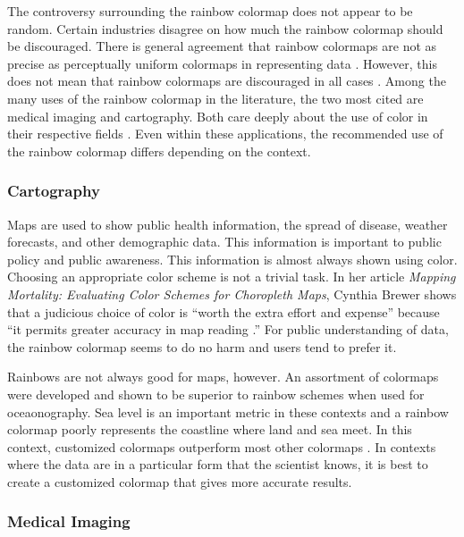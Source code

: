 \documentclass[journal]{IEEEtran}
\begin{document}
The controversy surrounding the rainbow colormap does not appear to be random.
Certain industries disagree on how much the rainbow colormap should be 
discouraged. There is general agreement that rainbow colormaps are not as 
precise as perceptually uniform colormaps in representing data 
\cite{blackvwhite}. However, this 
does not mean that rainbow colormaps are discouraged in all cases
 \cite{spectralschemes}. 
Among the many uses of the rainbow colormap in the
literature, the two most cited are
medical imaging and cartography. Both care deeply about the use of color in 
their respective fields \cite{colorguidelines, standardmedimg}. Even within
 these applications, the recommended use of the rainbow colormap differs
 depending on the context.
 
\subsubsection{Cartography}

Maps are used to show public health information, the spread of disease, weather
forecasts, and other demographic data. This information is important to
 public policy and public awareness. This information is almost always shown
 using color. Choosing an appropriate color scheme is not a trivial task. In her
article \textit{Mapping Mortality: Evaluating Color Schemes for Choropleth
Maps}, Cynthia Brewer shows that a judicious choice of color is ``worth 
the extra effort and expense'' because ``it permits greater accuracy in map
reading \cite{choropleth}.'' For public understanding of data, the rainbow colormap
seems to do no harm and users tend to prefer it.

Rainbows are not always good for maps, however. An assortment of colormaps were
developed and shown to be superior to rainbow schemes when used for oceaonography.
Sea level is an important metric in these contexts and a rainbow colormap poorly 
represents the coastline where land and sea meet. In this context, customized colormaps
outperform most other colormaps \cite{oceanography}. In contexts where the data are in a particular form
that the scientist knows, it is best to create a customized colormap that gives 
more accurate results.

\subsubsection{Medical Imaging}
\end{document}
